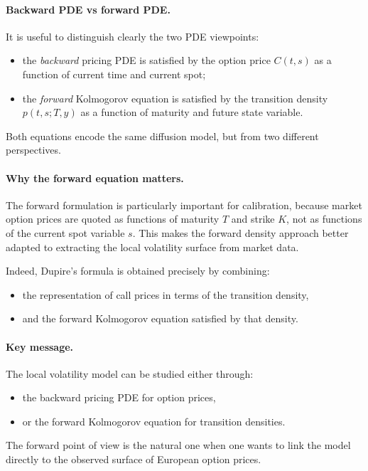 \documentclass[11pt]{article}
\theoremstyle{plain}
\theoremstyle{definition}
\theoremstyle{remark}
\begin{document}
\paragraph{Backward PDE vs forward PDE.}
It is useful to distinguish clearly the two PDE viewpoints:
\begin{itemize}[leftmargin=1.4em]
    \item the \emph{backward} pricing PDE is satisfied by the option
    price \(C(t,s)\) as a function of current time and current spot;
    \item the \emph{forward} Kolmogorov equation is satisfied by the
    transition density \(p(t,s;T,y)\) as a function of maturity and
    future state variable.
\end{itemize}

Both equations encode the same diffusion model, but from two different
perspectives.

\paragraph{Why the forward equation matters.}
The forward formulation is particularly important for calibration,
because market option prices are quoted as functions of maturity \(T\)
and strike \(K\), not as functions of the current spot variable \(s\).
This makes the forward density approach better adapted to extracting the
local volatility surface from market data.

Indeed, Dupire's formula is obtained precisely by combining:
\begin{itemize}[leftmargin=1.4em]
    \item the representation of call prices in terms of the transition
    density,
    \item and the forward Kolmogorov equation satisfied by that density.
\end{itemize}

\paragraph{Key message.}
The local volatility model can be studied either through:
\begin{itemize}[leftmargin=1.4em]
    \item the backward pricing PDE for option prices,
    \item or the forward Kolmogorov equation for transition densities.
\end{itemize}
The forward point of view is the natural one when one wants to link the
model directly to the observed surface of European option prices.
\end{document}
